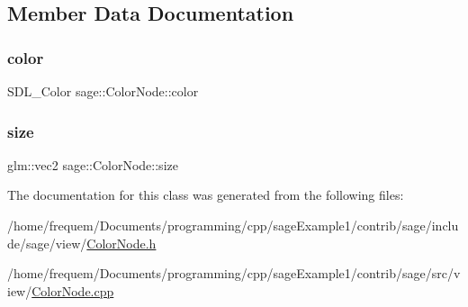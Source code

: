 \subsection{Member Data Documentation}
\mbox{\label{classsage_1_1ColorNode_aad5832e161e608730df9512894725d2d}} 
\subsubsection{\texorpdfstring{color}{color}}
{\footnotesize\ttfamily S\+D\+L\+\_\+\+Color sage\+::\+Color\+Node\+::color\hspace{0.3cm}{\ttfamily [private]}}

\mbox{\label{classsage_1_1ColorNode_a04b687374b9c171ff820c514f15b0ae0}} 
\subsubsection{\texorpdfstring{size}{size}}
{\footnotesize\ttfamily glm\+::vec2 sage\+::\+Color\+Node\+::size\hspace{0.3cm}{\ttfamily [private]}}



The documentation for this class was generated from the following files\+:\begin{DoxyCompactItemize}
\item 
/home/frequem/\+Documents/programming/cpp/sage\+Example1/contrib/sage/include/sage/view/\mbox{\hyperlink{ColorNode_8h}{Color\+Node.\+h}}\item 
/home/frequem/\+Documents/programming/cpp/sage\+Example1/contrib/sage/src/view/\mbox{\hyperlink{ColorNode_8cpp}{Color\+Node.\+cpp}}\end{DoxyCompactItemize}
